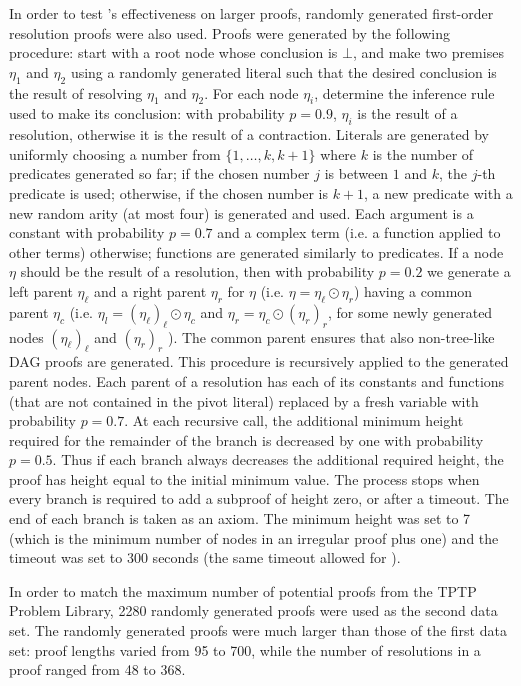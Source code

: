 {In order to test {\FORPI}'s effectiveness on larger proofs, randomly generated first-order resolution proofs were also used.
Proofs were generated by the following procedure: start with a root node whose conclusion is $\bot$, and make two premises $\eta_1$ and $\eta_2$ using a randomly generated literal such that the desired conclusion is the result of resolving $\eta_1$ and $\eta_2$. For each node $\eta_i$, determine the inference rule used to make its conclusion: with probability $p=0.9$, $\eta_i$ is the result of a resolution, otherwise it is the result of a contraction. 
Literals are generated by uniformly choosing a number from $\{1,\dots,k,k+1\}$ where $k$ is the number of predicates generated so far; if the chosen number $j$ is between $1$ and $k$, the $j$-th predicate is used; otherwise, if the chosen number is $k+1$, a new predicate with a new random arity (at most four) is generated and used. Each argument is a constant with probability $p=0.7$ and a complex term (i.e. a function applied to other terms) otherwise; functions are generated similarly to predicates. 
If a node $\eta$ should be the result of a resolution, then with probability $p=0.2$ we generate a left parent $\eta_\ell$ and a right parent $\eta_r$ for $\eta$ (i.e. $\eta = \eta_\ell \odot \eta_r$) having a common parent $\eta_c$ (i.e. $\eta_l = (\eta_\ell)_\ell \odot \eta_c$ and $\eta_r = \eta_c \odot (\eta_r)_r$, for some newly generated nodes $(\eta_\ell)_\ell$ and $(\eta_r)_r$ ). The common parent ensures that also non-tree-like DAG proofs are generated. This procedure is recursively applied to the generated parent nodes. 
Each parent of a resolution has each of its constants and functions (that are not contained in the pivot literal) replaced by a fresh variable with probability $p=0.7$.
At each recursive call, the additional minimum height required for the remainder of the branch is decreased by one with probability $p=0.5$. Thus if each branch always decreases the additional required height, the proof has height equal to the initial minimum value. The process stops when every branch is required to add a subproof of height zero, or after a timeout. The end of each branch is taken as an axiom. The minimum height was set to 7 (which is the minimum number of nodes in an irregular proof plus one) and the timeout was set to 300 seconds (the same timeout allowed for {\SPASS}).


In order to match the maximum number of potential proofs from the TPTP Problem Library, 2280 randomly generated proofs were used as the second data set. The randomly generated proofs were much larger than those of the first data set: proof lengths varied from 95 to 700, while the number of resolutions in a proof ranged from 48 to 368.

}
